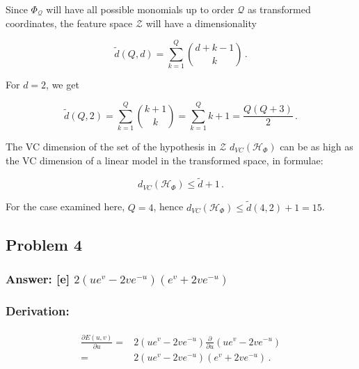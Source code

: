 \documentclass[11pt]{article}
\begin{document}
Since \(\Phi_\mathcal{Q}\) will have all possible monomials up to order
\(\mathcal{Q}\) as transformed coordinates, the feature space
\(\mathcal{Z}\) will have a dimensionality

\begin{equation}
\tilde{d}(Q,d)=\sum^Q_{k=1}{d+k-1 \choose k}\,.
\end{equation}

For \(d=2\), we get

\begin{equation}
\tilde{d}(Q,2)=\sum^Q_{k=1}{k+1 \choose k}= \sum^Q_{k=1} k+1 = \frac{Q(Q+3)}{2} \,.
\end{equation}

The VC dimension of the set of the hypothesis in \(\mathcal{Z}\)
\(d_{VC}(\mathcal{H}_{\Phi})\) can be as high as the VC dimension of a
linear model in the transformed space, in formulae:

\begin{equation}
d_{VC}(\mathcal{H}_{\Phi})\le\tilde{d}+1\,.
\end{equation}

For the case examined here, \(Q=4\), hence
\(d_{VC}(\mathcal{H}_{\Phi})\le \tilde{d}(4,2)+1=15\).

    \hypertarget{problem-4}{%
\subsection{Problem 4}\label{problem-4}}

\hypertarget{answer-e-2uev-2ve-uev2ve-u}{%
\subsubsection{\texorpdfstring{Answer: {[}e{]}
\(2(ue^v-2ve^{-u})(e^v+2ve^{-u})\)}{Answer: {[}e{]} 2(ue\^{}v-2ve\^{}\{-u\})(e\^{}v+2ve\^{}\{-u\})}}\label{answer-e-2uev-2ve-uev2ve-u}}

\hypertarget{derivation}{%
\subsubsection{Derivation:}\label{derivation}}

\begin{align}
\begin{split}
\frac{\partial E(u,v)}{\partial u}=&2(ue^v-2ve^{-u})\frac{\partial}{\partial u}(ue^v-2ve^{-u})\\ =&2(ue^v-2ve^{-u})(e^v+2ve^{-u})\,.
\end{split}
\end{align}
\end{document}
